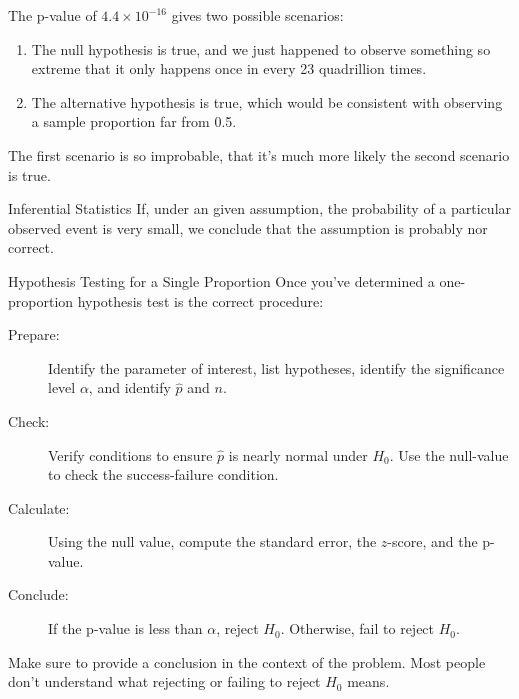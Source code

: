 \documentclass{beamer}
\begin{document}
\begin{frame}
  \begin{note}
    The p-value of $4.4\times10^{-16}$ gives two possible scenarios:\pause
    \begin{enumerate}
    \item The null hypothesis is true, and we just happened to observe something so extreme that it only happens once in every 23 quadrillion times.\pause
    \item The alternative hypothesis is true, which would be consistent with observing a sample proportion far from 0.5.
    \end{enumerate}\pause

    The first scenario is so improbable, that it's much more likely the second scenario is true.
  \end{note}\pause

  \begin{block}{Inferential Statistics}
      If, under an given assumption, the probability of a particular observed event is very small, we conclude that the assumption is probably nor correct.
  \end{block}
\end{frame}

\begin{frame}
  \begin{block}{Hypothesis Testing for a Single Proportion}
    Once you've determined a one-proportion hypothesis test is the correct procedure:\pause
    \begin{description}
    \item[Prepare:] Identify the parameter of interest, list hypotheses, identify the significance level $\alpha$, and identify $\hat{p}$ and $n$.\pause
    \item[Check:] Verify conditions to ensure $\hat{p}$ is nearly normal under $H_0$. Use the null-value to check the success-failure condition.\pause
    \item[Calculate:] Using the null value, compute the standard error, the $z$-score, and the p-value.\pause
    \item[Conclude:] If the p-value is less than $\alpha$, reject $H_0$. Otherwise, fail to reject $H_0$.
    \end{description}
  \end{block}\pause

  \begin{note}
    Make sure to provide a conclusion in the context of the problem. Most people don't understand what rejecting or failing to reject $H_0$ means.
  \end{note}
\end{frame}
\end{document}
